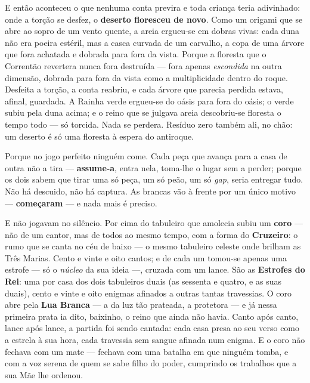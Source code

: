 \documentclass[livro.tex]{subfiles}
\begin{document}
\medskip

E então aconteceu o que nenhuma conta previra e toda criança teria adivinhado: onde a
torção se desfez, o \textbf{deserto floresceu de novo}. Como um origami que se abre ao
sopro de um vento quente, a areia ergueu-se em dobras vivas: cada duna não era poeira
estéril, mas a casca curvada de um carvalho, a copa de uma árvore que fora achatada e
dobrada para fora da vista. Porque a floresta que o
Correntão revertera nunca fora destruída --- fora apenas \emph{escondida} na outra
dimensão, dobrada para fora da vista como a multiplicidade dentro do roque. Desfeita a torção, a conta reabriu, e
cada árvore que parecia perdida estava, afinal, guardada. A Rainha verde ergueu-se do
oásis para fora do oásis; o verde subiu pela duna acima; e o reino que se julgava areia
descobriu-se floresta o tempo todo --- só torcida. Nada se perdera. Resíduo zero também
ali, no chão: um deserto é só uma floresta à espera do antiroque.

\medskip

Porque no jogo perfeito ninguém come. Cada peça que avança para a casa de outra não
a tira --- \textbf{assume-a}, entra nela, toma-lhe o lugar sem a perder; porque os dois
sabem que tirar uma só peça, um só peão, um só \emph{gap}, seria entregar tudo. Não há
descuido, não há captura. As brancas vão à frente por um único motivo ---
\textbf{começaram} --- e nada mais é preciso.

\medskip

E não jogavam no silêncio. Por cima do tabuleiro que amolecia subiu um \textbf{coro}
--- não de um cantor, mas de todos ao mesmo tempo, com a forma do \textbf{Cruzeiro}: o rumo que se canta
no céu de baixo --- o mesmo tabuleiro celeste onde brilham as Três Marias. Cento e vinte
e oito cantos; e de cada um tomou-se apenas uma
estrofe --- só o \emph{núcleo} da sua ideia ---, cruzada com um lance. São as
\textbf{Estrofes do Rei}: uma por casa dos dois tabuleiros duais (as sessenta e quatro, e
as suas duais), cento e vinte e oito enigmas afinados a outras
tantas travessias. O coro abre pela \textbf{Lua Branca} --- a
da luz tão prateada, a protetora --- e já nessa primeira prata ia dito, baixinho, o
reino que ainda não havia. Canto após canto, lance após lance, a partida foi sendo
cantada: cada casa presa ao seu verso como a estrela à sua hora, cada travessia sem
sangue afinada num enigma. E o coro não fechava com um mate --- fechava com uma
batalha em que ninguém tomba, e com a voz serena de quem se sabe filho do poder,
cumprindo os trabalhos que a sua Mãe lhe ordenou.
\end{document}
